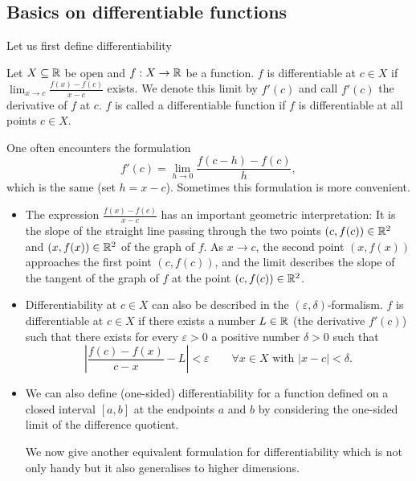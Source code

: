 \documentclass[10pt, a4paper]{article}
\begin{document}
\subsection{Basics on differentiable functions}

Let us first define differentiability
\begin{definition}
    Let $X \subseteq \mathbb{R}$ be open and $f : X \rightarrow \mathbb{R}$ be a function.
    $f$ is differentiable at $c \in X$ if $\lim_{x \rightarrow c}\frac{f(x) - f(c)}{x - c}$ exists.
    We denote this limit by $f'(c)$ and call $f'(c)$ the derivative of $f$ at $c$.
    $f$ is called a differentiable function if $f$ is differentiable at all points $c \in X$.
\end{definition}

One often encounters the formulation
\[
f'(c) = \lim_{h \rightarrow 0}\frac{f(c - h) - f(c)}{h},
\]
which is the same
(set $h = x - c$).
Sometimes this formulation is more convenient.

\begin{remark}\phantom{}
    \begin{itemize}
        \item The expression $\frac{f(x) - f(c)}{x - c}$ has an important geometric interpretation:
        It is the slope of the straight line passing through the two points $(c, f(c)) \in \mathbb{R} ^ 2$ and $(x, f(x)) \in \mathbb{R} ^ 2$ of the graph of $f$.
        As $x \rightarrow c$,
        the second point $(x, f(x))$ approaches the first point $(c, f(c))$,
        and the limit describes the slope of the tangent of the graph of $f$ at the point $(c, f(c)) \in \mathbb{R} ^ 2$.

        \item Differentiability at $c \in X$ can also be described in the $(\varepsilon, \delta)$-formalism.
        $f$ is differentiable at $c \in X$ if there exists a number $L \in \mathbb{R}$
        (the derivative $f'(c)$)
        such that there exists for every $\varepsilon > 0$ a positive number $\delta > 0$ such that
        \[
        \left|\frac{f(c) - f(x)}{c - x} - L\right| < \varepsilon\qquad\forall x \in X \text{ with } |x - c| < \delta.
        \]

        \item We can also define
        (one-sided)
        differentiability for a function defined on a closed interval $[a, b]$ at the endpoints $a$ and $b$ by considering the one-sided limit of the difference quotient.

        We now give another equivalent formulation for differentiability which is not only handy but it also generalises to higher dimensions.
    \end{itemize}
\end{remark}
\end{document}
